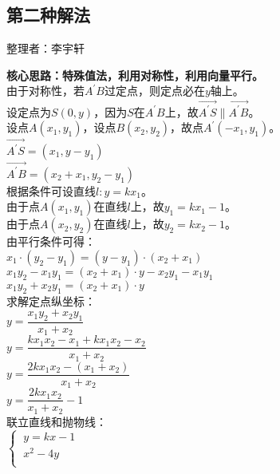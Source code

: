 \documentclass[UTF8]{ctexart}
\begin{document}
\newpage

\subsection{第二种解法}
    \begin{center}
        整理者：李宇轩
    \end{center}
    \begin{multicols}{2}
        \small
        \textbf{核心思路：特殊值法，利用对称性，利用向量平行。}\\[5mm]
        由于对称性，若$A^{'}B$过定点，则定点必在$y$轴上。\\[5mm]
        设定点为$S(0,y)$，因为$S$在$A^{'}B$上，故$\overrightarrow{A^{'}S}\parallel\overrightarrow{A^{'}B}$。\\[5mm]
        设点$A(x_1,y_1)$，设点$B(x_2,y_2)$，故点$A^{'}(-x_1,y_1)$。\\[5mm]
        $\overrightarrow{A^{'}S}=(x_1,y-y_1)$\\[5mm]
        $\overrightarrow{A^{'}B}=(x_2+x_1,y_2-y_1)$\\[7mm]
        根据条件可设直线$l:y=kx_1$。\\[5mm]
        由于点$A(x_1,y_1)$在直线$l$上，故$y_1=kx_1-1$。\\[5mm]
        由于点$A(x_2,y_2)$在直线$l$上，故$y_2=kx_2-1$。\\[8mm]
        由平行条件可得：\\[3mm]
        $x_1\cdot(y_2-y_1)=(y-y_1)\cdot(x_2+x_1)$\\[5mm]
        $x_1y_2-x_1y_1=(x_2+x_1)\cdot y-x_2y_1-x_1y_1$\\[5mm]
        $x_1y_2+x_2y_1=(x_2+x_1)\cdot y$\\[8mm]
        求解定点纵坐标：\\[4mm]
        $y=\dfrac{x_1y_2+x_2y_1}{x_1+x_2}$\\[5mm]
        $y=\dfrac{kx_1x_2-x_1+kx_1x_2-x_2}{x_1+x_2}$\\[5mm]
        $y=\dfrac{2kx_1x_2-(x_1+x_2)}{x_1+x_2}$\\[5mm]
        $y=\dfrac{2kx_1x_2}{x_1+x_2}-1$\\[50mm]
        联立直线和抛物线：\\[4mm]
        \begin{math}
            \begin{cases}
                ~y=kx-1\\[1mm]
                ~x^2-4y\\[1mm]
            \end{cases}

\end{math}
\end{multicols}
\end{document}
